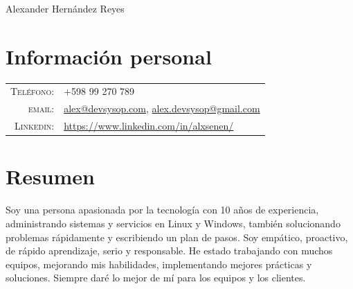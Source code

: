 \documentclass[a4paper,12pt]{article}
\begin{document}
\vspace*{-0.5cm}

\pagestyle{empty} %

{\huge Alexander Hern\'andez Reyes}
\hfill
{}\\
\section{Informaci\'on personal}
\begin{tabular}{rl}
    \textsc{Tel\'efono:}     & +598 99 270 789 \\
    \textsc{email:}     & \href{mailto:alex@devsysop.com}{alex@devsysop.com}, \href{mailto:alex.devsysop@gmail.com}{alex.devsysop@gmail.com} \\
    \textsc{Linkedin:}     & \href{https://www.linkedin.com/in/alxsenen/}{https://www.linkedin.com/in/alxsenen/} \\
	
\end{tabular}
\section{Resumen}
\justify
Soy una persona apasionada por la tecnología con 10 años de experiencia, administrando sistemas y servicios en Linux y Windows, también solucionando problemas rápidamente y escribiendo un plan de pasos. Soy empático, proactivo, de rápido aprendizaje, serio y responsable.
He estado trabajando con muchos equipos, mejorando mis habilidades, implementando mejores prácticas y soluciones. Siempre daré lo mejor de mí para los equipos y los clientes.

\end{document}
